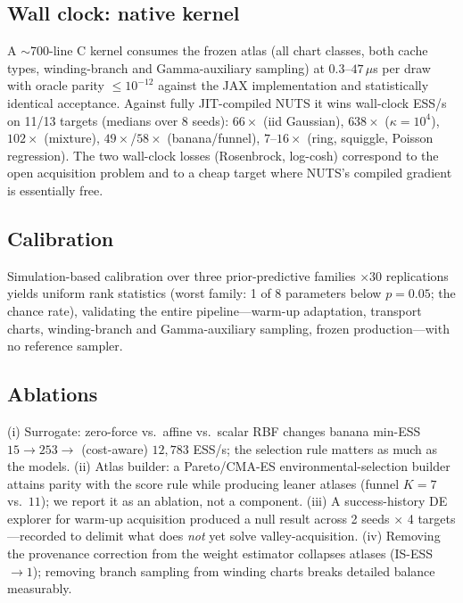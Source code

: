 \documentclass[10pt,journal,compsoc]{IEEEtran}
\begin{document}
\subsection{Wall clock: native kernel}
A $\sim$700-line C kernel consumes the frozen atlas (all chart classes,
both cache types, winding-branch and Gamma-auxiliary sampling) at
$0.3$--$47\,\mu$s per draw with oracle parity $\le10^{-12}$ against the
JAX implementation and statistically identical acceptance. Against fully
JIT-compiled NUTS it wins wall-clock ESS/s on 11/13 targets (medians over
8 seeds): $66\times$ (iid Gaussian), $638\times$ ($\kappa{=}10^4$),
$102\times$ (mixture), $49\times$/$58\times$ (banana/funnel),
$7$--$16\times$ (ring, squiggle, Poisson regression). The two wall-clock
losses (Rosenbrock, log-cosh) correspond to the open acquisition problem
and to a cheap target where NUTS's compiled gradient is essentially free.

\subsection{Calibration}
Simulation-based calibration \cite{talts2018} over three prior-predictive
families $\times30$ replications yields uniform rank statistics (worst
family: 1 of 8 parameters below $p{=}0.05$; the chance rate), validating
the entire pipeline---warm-up adaptation, transport charts, winding-branch
and Gamma-auxiliary sampling, frozen production---with no reference
sampler.

\subsection{Ablations}
(i) Surrogate: zero-force vs.\ affine vs.\ scalar RBF changes banana
min-ESS $15\to253\to$ (cost-aware) $12{,}783$ ESS/s; the selection rule
matters as much as the models. (ii) Atlas builder: a Pareto/CMA-ES
environmental-selection builder \cite{hansen2001,deb2002} attains parity
with the score rule while producing leaner atlases (funnel $K{=}7$ vs.\
$11$); we report it as an ablation, not a component. (iii) A
success-history DE explorer \cite{tanabe2014} for warm-up acquisition
produced a null result across 2 seeds $\times$ 4 targets---recorded to
delimit what does \emph{not} yet solve valley-acquisition. (iv) Removing
the provenance correction from the weight estimator collapses atlases
(IS-ESS $\to1$); removing branch sampling from winding charts breaks
detailed balance measurably.
\end{document}

